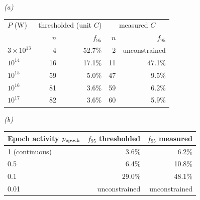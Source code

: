 \emph{(a)}\\[2pt]
\begin{tabular}{@{}lrrrr@{}}
\toprule
$P$ (W) & \multicolumn{2}{c}{thresholded (unit $C$)} &
\multicolumn{2}{c}{measured $C$} \\
 & $n$ & $f_{95}$ & $n$ & $f_{95}$ \\
\midrule
$3\times10^{13}$ & 4 & 52.7\% & 2 & unconstrained \\
$10^{14}$ & 16 & 17.1\% & 11 & 47.1\% \\
$10^{15}$ & 59 & 5.0\% & 47 & 9.5\% \\
$10^{16}$ & 81 & 3.6\% & 59 & 6.2\% \\
$10^{17}$ & 82 & 3.6\% & 60 & 5.9\% \\
\bottomrule
\end{tabular}

\smallskip
\emph{(b)}\\[2pt]
\begin{tabular}{@{}lrr@{}}
\toprule
Epoch activity $p_{\rm epoch}$ & $f_{95}$ thresholded & $f_{95}$ measured \\
\midrule
1 (continuous) & 3.6\% & 6.2\% \\
0.5 & 6.4\% & 10.8\% \\
0.1 & 29.0\% & 48.1\% \\
0.01 & unconstrained & unconstrained \\
\bottomrule
\end{tabular}
